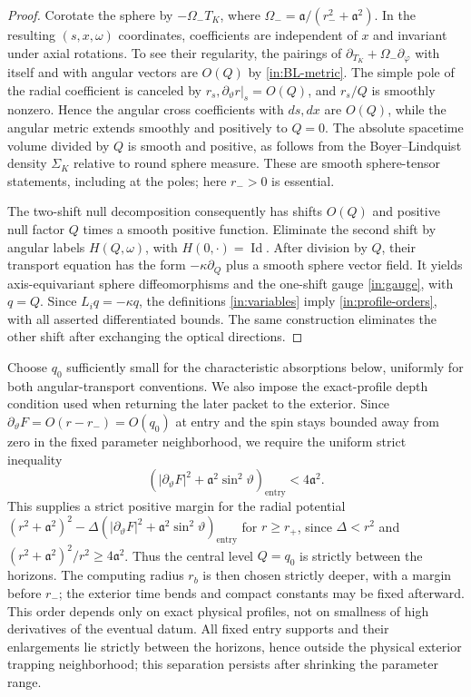 \begin{proof}
Corotate the sphere by $-\Omega_-T_K$, where
$\Omega_- =\mathfrak a/(r_-^2+\mathfrak a^2)$.
In the resulting $(s,x,\omega)$ coordinates, coefficients are independent
of $x$ and invariant under axial rotations. To see their regularity,
the pairings of $\partial_{T_K}+\Omega_-\partial_\varphi$ with itself
and with angular vectors are $O(Q)$ by \eqref{in:BL-metric}.
The simple pole of the radial coefficient is canceled by
$r_s,\partial_\vartheta r|_s=O(Q)$, and $r_s/Q$ is smoothly
nonzero. Hence the angular cross coefficients with $ds,dx$ are $O(Q)$,
while the angular metric extends smoothly and positively to $Q=0$.
The absolute spacetime volume divided by $Q$ is smooth and positive,
as follows from the Boyer--Lindquist density $\Sigma_K$ relative to
round sphere measure. These are smooth sphere-tensor statements,
including at the poles; here $r_->0$ is essential.

The two-shift null decomposition consequently has shifts $O(Q)$ and
positive null factor $Q$ times a smooth positive function. Eliminate
the second shift by angular labels
$H(Q,\omega)$, with $H(0,\cdot)=\operatorname{Id}$.
After division by $Q$, their transport equation has the form
$-\kappa\partial_Q$ plus a smooth sphere vector field.
It yields axis-equivariant sphere diffeomorphisms and the one-shift
gauge \eqref{in:gauge}, with $q=Q$. Since $L_iq=-\kappa q$,
the definitions \eqref{in:variables} imply
\eqref{in:profile-orders}, with all asserted differentiated bounds.
The same construction eliminates the other shift after exchanging the
optical directions.
\end{proof}

Choose $q_0$ sufficiently small for the characteristic absorptions
below, uniformly for both angular-transport conventions. We also impose
the exact-profile depth condition used when returning the later packet
to the exterior. Since $\partial_\vartheta F=O(r-r_-)=O(q_0)$ at
entry and the spin stays bounded away from zero in the fixed
parameter neighborhood, we require the uniform strict inequality
\begin{equation}\label{in:profile-depth}
 \left(|\partial_\vartheta F|^2+
                   \mathfrak a^2\sin^2\vartheta\right)_{\mathrm{entry}}
 <4\mathfrak a^2.
\end{equation}
This supplies a strict positive margin for the radial potential
$(r^2+\mathfrak a^2)^2-\Delta
(|\partial_\vartheta F|^2+\mathfrak a^2\sin^2\vartheta)_{\mathrm{entry}}$
for $r\ge r_+$, since $\Delta<r^2$ and
$(r^2+\mathfrak a^2)^2/r^2\ge4\mathfrak a^2$.
Thus the central level $Q=q_0$ is
strictly between the horizons. The computing radius $r_b$ is then
chosen strictly deeper, with a margin before $r_-$; the exterior time
bends and compact constants may be fixed afterward. This order depends
only on exact physical profiles, not on smallness of high derivatives
of the eventual datum.
All fixed entry supports and their enlargements lie strictly between
the horizons, hence outside the physical exterior trapping neighborhood;
this separation persists after shrinking the parameter range.

